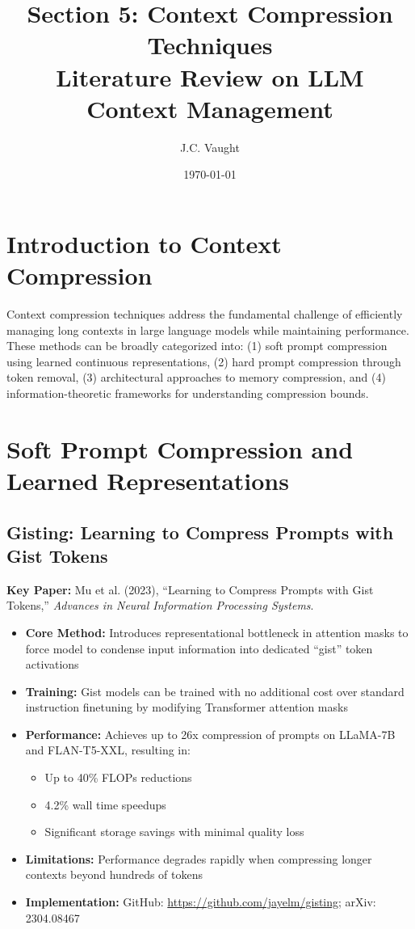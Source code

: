 \documentclass[11pt]{article}
\title{\textbf{\color{garnet}Section 5: Context Compression Techniques}\\
\large{Literature Review on LLM Context Management}}
\author{J.C. Vaught}
\date{\today}
\begin{document}
\maketitle

\section{Introduction to Context Compression}

Context compression techniques address the fundamental challenge of efficiently managing long contexts in large language models while maintaining performance. These methods can be broadly categorized into: (1) soft prompt compression using learned continuous representations, (2) hard prompt compression through token removal, (3) architectural approaches to memory compression, and (4) information-theoretic frameworks for understanding compression bounds.

\section{Soft Prompt Compression and Learned Representations}

\subsection{Gisting: Learning to Compress Prompts with Gist Tokens}

\textbf{Key Paper:} Mu et al. (2023), ``Learning to Compress Prompts with Gist Tokens,'' \textit{Advances in Neural Information Processing Systems}.

\begin{itemize}[leftmargin=*]
    \item \textbf{Core Method:} Introduces representational bottleneck in attention masks to force model to condense input information into dedicated ``gist'' token activations
    \item \textbf{Training:} Gist models can be trained with no additional cost over standard instruction finetuning by modifying Transformer attention masks
    \item \textbf{Performance:} Achieves up to 26x compression of prompts on LLaMA-7B and FLAN-T5-XXL, resulting in:
    \begin{itemize}
        \item Up to 40\% FLOPs reductions
        \item 4.2\% wall time speedups
        \item Significant storage savings with minimal quality loss
    \end{itemize}
    \item \textbf{Limitations:} Performance degrades rapidly when compressing longer contexts beyond hundreds of tokens
    \item \textbf{Implementation:} GitHub: \url{https://github.com/jayelm/gisting}; arXiv: 2304.08467
\end{itemize}
\end{document}
